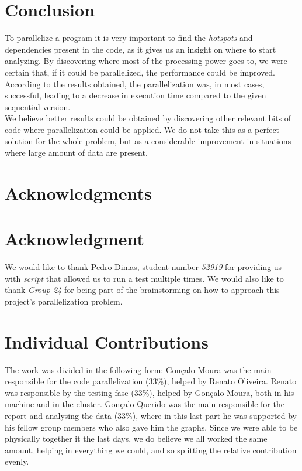 \documentclass[10pt,journal,compsoc]{IEEEtran}
\begin{document}
\section{Conclusion}
To parallelize a program it is very important to find the {\itshape hotspots} and dependencies present in the code, as it gives us an insight on where to start analyzing. By discovering where most of the processing power goes to, we were certain that, if it could be parallelized, the performance could be improved.
\\According to the results obtained, the parallelization was, in most cases, successful, leading to a decrease in execution time compared to the given sequential version.
\\We believe better results could be obtained by discovering other relevant bits of code where parallelization could be applied. We do not take this as a perfect solution for the whole problem, but as a considerable improvement in situations where large amount of data are present. 

\ifCLASSOPTIONcompsoc
  \section*{Acknowledgments}
  
\else
  \section*{Acknowledgment}
\fi

 We would like to thank Pedro Dimas, student number {\itshape 52919} for providing us with {\itshape script} that allowed us to run a test multiple times. We would also like to thank {\itshape Group 24} for being part of the brainstorming on how to approach this project's parallelization problem.
 
\section*{Individual Contributions}

The work was divided in the following form: Gonçalo Moura was the main responsible for the code parallelization (33\%), helped by Renato Oliveira. Renato was responsible by the testing fase (33\%), helped by Gonçalo Moura, both in his machine and in the cluster. Gonçalo Querido was the main responsible for the report and analysing the data (33\%), where in this last part he was supported by his fellow group members who also gave him the graphs. Since we were able to be physically together it the last days, we do believe we all worked the same amount, helping in everything we could, and so splitting the relative contribution evenly.
\end{document}
